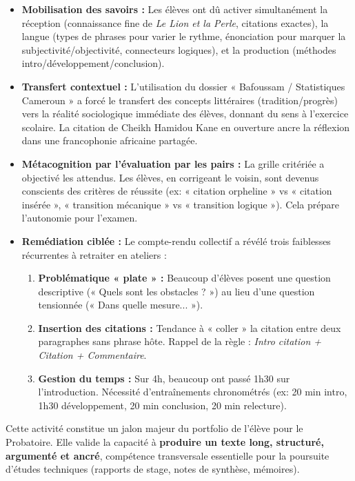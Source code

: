 \documentclass[11pt]{article}
\begin{document}
\begin{aretenir}
\begin{itemize}
    \item \textbf{Mobilisation des savoirs :} Les élèves ont dû activer simultanément la réception (connaissance fine de \emph{Le Lion et la Perle}, citations exactes), la langue (types de phrases pour varier le rythme, énonciation pour marquer la subjectivité/objectivité, connecteurs logiques), et la production (méthodes intro/développement/conclusion).
    \item \textbf{Transfert contextuel :} L'utilisation du dossier « Bafoussam / Statistiques Cameroun » a forcé le transfert des concepts littéraires (tradition/progrès) vers la réalité sociologique immédiate des élèves, donnant du sens à l'exercice scolaire. La citation de Cheikh Hamidou Kane en ouverture ancre la réflexion dans une francophonie africaine partagée.
    \item \textbf{Métacognition par l'évaluation par les pairs :} La grille critériée a objectivé les attendus. Les élèves, en corrigeant le voisin, sont devenus conscients des critères de réussite (ex: « citation orpheline » vs « citation insérée », « transition mécanique » vs « transition logique »). Cela prépare l'autonomie pour l'examen.
    \item \textbf{Remédiation ciblée :} Le compte-rendu collectif a révélé trois faiblesses récurrentes à retraiter en ateliers :
    \begin{enumerate}
        \item \textbf{Problématique « plate » :} Beaucoup d'élèves posent une question descriptive (« Quels sont les obstacles ? ») au lieu d'une question tensionnée (« Dans quelle mesure... »).
        \item \textbf{Insertion des citations :} Tendance à « coller » la citation entre deux paragraphes sans phrase hôte. Rappel de la règle : \emph{Intro citation + Citation + Commentaire}.
        \item \textbf{Gestion du temps :} Sur 4h, beaucoup ont passé 1h30 sur l'introduction. Nécessité d'entraînements chronométrés (ex: 20 min intro, 1h30 développement, 20 min conclusion, 20 min relecture).
    \end{enumerate}
\end{itemize}
\end{aretenir}

\noindent Cette activité constitue un jalon majeur du portfolio de l'élève pour le Probatoire. Elle valide la capacité à \textbf{produire un texte long, structuré, argumenté et ancré}, compétence transversale essentielle pour la poursuite d'études techniques (rapports de stage, notes de synthèse, mémoires).
\end{document}
